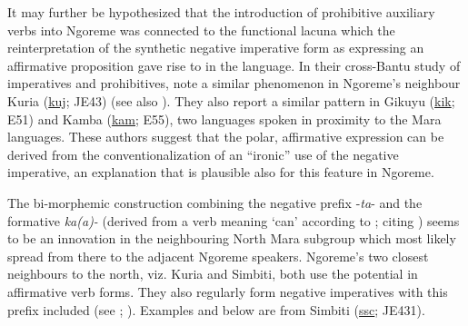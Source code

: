 \documentclass[output=paper,colorlinks,citecolor=brown,draftmode]{langscibook}
\begin{document}
It may further be hypothesized that the introduction of prohibitive auxiliary verbs into Ngoreme was connected to the functional lacuna which the reinterpretation of the synthetic negative imperative form as expressing an affirmative proposition gave rise to in the language. In their cross-Bantu study of imperatives and prohibitives, \citet{DevosVanOlmen2013} note a similar phenomenon in Ngoreme’s neighbour Kuria (\href{https://iso639-3.sil.org/code/kuj}{kuj}; JE43) (see also \citealt[293]{Cammenga2004}). They also report a similar pattern in Gikuyu (\href{https://iso639-3.sil.org/code/kik}{kik}; E51) and Kamba (\href{https://iso639-3.sil.org/code/kam}{kam}; E55), two languages spoken in proximity to the Mara languages. These authors suggest that the polar, affirmative expression can be derived from the conventionalization of an “ironic” use of the negative imperative, an explanation that is plausible also for this feature in Ngoreme.
 
The bi-morphemic construction combining the negative prefix -\textit{ta}{}- and the formative \textit{ka(a)\nobreakdash-} (derived from a verb meaning ‘can’ according to \citealt[90]{Rose2001}; citing \citealt[230]{Cammenga1994}) seems to be an innovation in the neighbouring North Mara subgroup which most likely spread from there to the adjacent Ngoreme speakers. Ngoreme’s two closest neighbours to the north, viz. Kuria and Simbiti, both use the potential in affirmative verb forms. They also regularly form negative imperatives with this prefix included (see \citealt[23]{Sillery1936}; \citealt[17]{WalkerOverton2018}). Examples  and  below are from Simbiti (\href{https://iso639-3.sil.org/code/ssc}{ssc}; JE431). 

\end{document}
